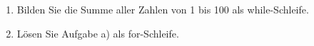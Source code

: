 \begin{enumerate}

\item Bilden Sie die Summe aller Zahlen von 1 bis 100 als while-Schleife.

\item Lösen Sie Aufgabe a) als for-Schleife.

\end{enumerate}